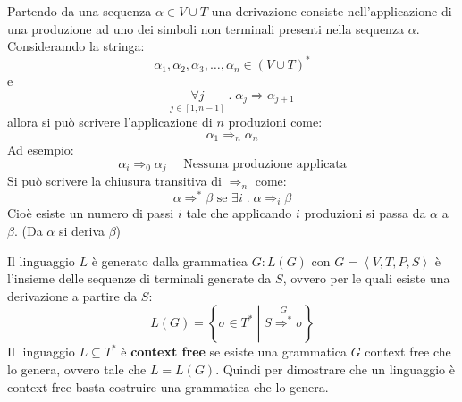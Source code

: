\documentclass[a4paper]{article}
\begin{document}
\begin{definition}[Derivazione]
  Partendo da una sequenza \( \alpha \in V \cup T \) una derivazione consiste nell'applicazione
  di una produzione ad uno dei simboli non terminali presenti nella sequenza \( \alpha \).
  Consideramdo la stringa:
  \[
    \alpha_1, \alpha_2, \alpha_3, \ldots, \alpha_n \in (V \cup T)^*
  \] 
  e
  \[
    \underset{j \in \left[ 1, n-1 \right]}{\forall j} \;.\; \alpha_j \Rightarrow \alpha_{j+1}
  \] 
  allora si può scrivere l'applicazione di \( n \) produzioni come:
  \[
   \alpha_1 \Rightarrow_n \alpha_n
  \] 
  Ad esempio:
  \[
    \alpha_i \Rightarrow_0 \alpha_j \quad \text{ Nessuna produzione applicata}
  \] 
  \vspace{1em}
  \noindent
  Si può scrivere la chiusura transitiva di \( \Rightarrow_n \) come:
  \[
    \alpha \Rightarrow^* \beta \text{ se } \exists i \;.\; \alpha \Rightarrow_i \beta
  \] 
  Cioè esiste un numero di passi \( i \) tale che applicando \( i \) produzioni si passa
  da \( \alpha \) a \( \beta \). (Da \( \alpha \) si deriva \( \beta \))
\end{definition}

\begin{definition}
  Il linguaggio \( L \) è generato dalla grammatica \( G: L(G) \) con \( G = \left<V,T,P,S\right> \)
  è l'insieme delle sequenze di terminali generate da \( S \), ovvero per le quali
  esiste una derivazione a partire da \( S \):
  \[
    L(G) = \left\{ \sigma \in T^* \;\left|\; S \stackrel{G}{\Rightarrow^*}
    \sigma \right. \right\}
  \] 
  Il linguaggio \( L \subseteq T^* \) è \textbf{context free} se esiste una grammatica
  \( G \) context free che lo genera, ovvero tale che \( L = L(G) \). Quindi per dimostrare
  che un linguaggio è context free basta costruire una grammatica che lo genera.
\end{definition}
\end{document}
